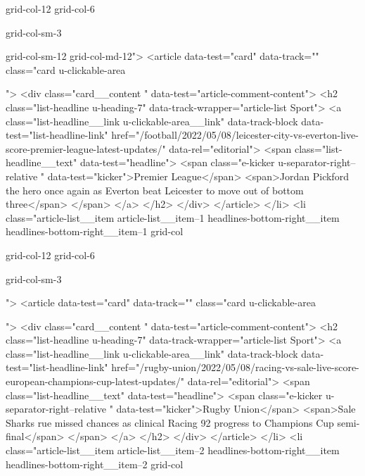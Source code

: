 {{{			
			
			grid-col-12
			grid-col-6
			
			
			
			
			
			grid-col-sm-3
			
			
			
			
			
			
			
			
			grid-col-sm-12 grid-col-md-12">
<article data-test="card" data-track="" class="card
			u-clickable-area
			
			
			
			
			
			
			
			
			 ">
<div class="card__content " data-test="article-comment-content">
<h2 class="list-headline  u-heading-7" data-track-wrapper="article-list Sport">
<a class="list-headline__link u-clickable-area__link" data-track-block data-test="list-headline-link" href="/football/2022/05/08/leicester-city-vs-everton-live-score-premier-league-latest-updates/" data-rel="editorial">
<span class="list-headline__text" data-test="headline">
<span class="e-kicker u-separator-right--relative " data-test="kicker">Premier League</span>
<span>Jordan Pickford the hero once again as Everton beat Leicester to move out of bottom three</span>
</span>
</a>
</h2>
</div>
</article>
</li>
<li class="article-list__item article-list__item--1 headlines-bottom-right__item headlines-bottom-right__item--1
			grid-col
			
			
			
			grid-col-12
			grid-col-6
			
			
			
			
			
			grid-col-sm-3
			
			
			
			
			
			
			
			
			">
<article data-test="card" data-track="" class="card
			u-clickable-area
			
			
			
			
			
			
			
			
			 ">
<div class="card__content " data-test="article-comment-content">
<h2 class="list-headline  u-heading-7" data-track-wrapper="article-list Sport">
<a class="list-headline__link u-clickable-area__link" data-track-block data-test="list-headline-link" href="/rugby-union/2022/05/08/racing-vs-sale-live-score-european-champions-cup-latest-updates/" data-rel="editorial">
<span class="list-headline__text" data-test="headline">
<span class="e-kicker u-separator-right--relative " data-test="kicker">Rugby Union</span>
<span>Sale Sharks rue missed chances as clinical Racing 92 progress to Champions Cup semi-final</span>
</span>
</a>
</h2>
</div>
</article>
</li>
<li class="article-list__item article-list__item--2 headlines-bottom-right__item headlines-bottom-right__item--2
			grid-col
			
}}}
